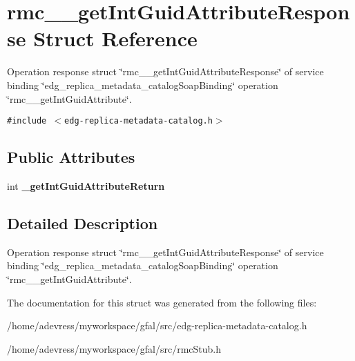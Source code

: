 \section{rmc\_\-\_\-get\-Int\-Guid\-Attribute\-Response Struct Reference}
\label{structrmc____getIntGuidAttributeResponse}
Operation response struct \char`\"{}rmc\_\-\_\-get\-Int\-Guid\-Attribute\-Response\char`\"{} of service binding \char`\"{}edg\_\-replica\_\-metadata\_\-catalog\-Soap\-Binding\char`\"{} operation \char`\"{}rmc\_\-\_\-get\-Int\-Guid\-Attribute\char`\"{}.  


{\tt \#include $<$edg-replica-metadata-catalog.h$>$}

\subsection*{Public Attributes}
\begin{CompactItemize}
\item 
int \textbf{\_\-get\-Int\-Guid\-Attribute\-Return}\label{structrmc____getIntGuidAttributeResponse_b68a3037f530903474a855911c17971c}

\end{CompactItemize}


\subsection{Detailed Description}
Operation response struct \char`\"{}rmc\_\-\_\-get\-Int\-Guid\-Attribute\-Response\char`\"{} of service binding \char`\"{}edg\_\-replica\_\-metadata\_\-catalog\-Soap\-Binding\char`\"{} operation \char`\"{}rmc\_\-\_\-get\-Int\-Guid\-Attribute\char`\"{}. 



The documentation for this struct was generated from the following files:\begin{CompactItemize}
\item 
/home/adevress/myworkspace/gfal/src/edg-replica-metadata-catalog.h\item 
/home/adevress/myworkspace/gfal/src/rmc\-Stub.h\end{CompactItemize}
